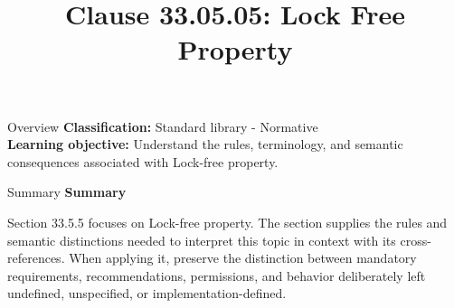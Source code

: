 \documentclass[10pt,letterpaper]{article}
\title{Clause 33.05.05: Lock Free Property}
\author{}
\date{}
\begin{document}
\maketitle
\begin{CornellOverviewBox}{Overview}
\textbf{Classification:} Standard library - Normative\\[2pt]
\textbf{Learning objective:} Understand the rules, terminology, and semantic consequences associated with Lock-free property.
\end{CornellOverviewBox}\begin{CornellSummaryBox}{Summary}
{\sffamily\bfseries\color{Accent} Summary}\par\vspace{3pt}Section 33.5.5 focuses on Lock-free property. The section supplies the rules and semantic distinctions needed to interpret this topic in context with its cross-references. When applying it, preserve the distinction between mandatory requirements, recommendations, permissions, and behavior deliberately left undefined, unspecified, or implementation-defined.
\end{CornellSummaryBox}
\end{document}
